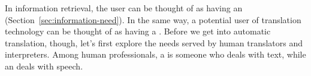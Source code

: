 In  information retrieval, the user can be thought of as
having an  (Section~\ref{sec:information-need}). In the same way, a 
potential user of translation technology
can be thought of as having a . 
%
Before we get into automatic translation, though, let's first explore the  needs served by human translators and interpreters.  Among human professionals, a  is someone who deals with text, while an  deals with speech.  





